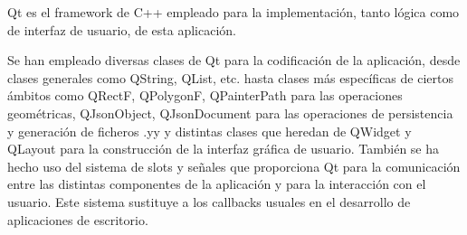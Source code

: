 Qt es el framework de C++ empleado para la implementación, tanto lógica como de interfaz de usuario, de esta aplicación.

Se han empleado diversas clases de Qt para la codificación de la aplicación, desde clases generales como QString, QList, etc. hasta clases más específicas de ciertos ámbitos como QRectF, QPolygonF, QPainterPath para las operaciones geométricas, QJsonObject, QJsonDocument para las operaciones de persistencia y generación de ficheros .yy y distintas clases que heredan de QWidget y QLayout para la construcción de la interfaz gráfica de usuario.
También se ha hecho uso del sistema de slots y señales que proporciona Qt para la comunicación entre las distintas componentes de la aplicación y para la interacción con el usuario. Este sistema sustituye a los callbacks usuales en el desarrollo de aplicaciones de escritorio.